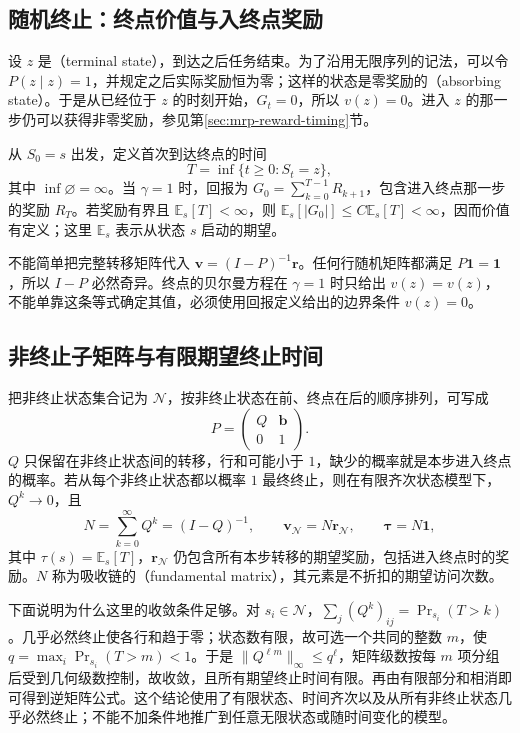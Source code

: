 \documentclass[UTF8]{ctexart}
\begin{document}
\subsection{随机终止：终点价值与入终点奖励}

设 $z$ 是（terminal state），到达之后任务结束。为了沿用无限序列的记法，可以令 $P(z\mid z)=1$，并规定之后实际奖励恒为零；这样的状态是零奖励的（absorbing state）。于是从已经位于 $z$ 的时刻开始，$G_t=0$，所以 $v(z)=0$。进入 $z$ 的那一步仍可以获得非零奖励，参见第\ref{sec:mrp-reward-timing}节。

从 $S_0=s$ 出发，定义首次到达终点的时间
\[
  T=\inf\{t\geq0:S_t=z\},
\]
其中 $\inf\varnothing=\infty$。当 $\gamma=1$ 时，回报为 $G_0=\sum_{k=0}^{T-1}R_{k+1}$，包含进入终点那一步的奖励 $R_T$。若奖励有界且 $\mathbb E_s[T]<\infty$，则 $\mathbb E_s[|G_0|]\leq C\mathbb E_s[T]<\infty$，因而价值有定义；这里 $\mathbb E_s$ 表示从状态 $s$ 启动的期望。

不能简单把完整转移矩阵代入 $\boldsymbol v=(I-P)^{-1}\boldsymbol r$。任何行随机矩阵都满足 $P\boldsymbol 1=\boldsymbol 1$，所以 $I-P$ 必然奇异。终点的贝尔曼方程在 $\gamma=1$ 时只给出 $v(z)=v(z)$，不能单靠这条等式确定其值，必须使用回报定义给出的边界条件 $v(z)=0$。

\subsection{非终止子矩阵与有限期望终止时间}

把非终止状态集合记为 $\mathcal N$，按非终止状态在前、终点在后的顺序排列，可写成
\[
  P=\begin{pmatrix}Q&\boldsymbol b\\0&1\end{pmatrix}.
\]
$Q$ 只保留在非终止状态间的转移，行和可能小于 $1$，缺少的概率就是本步进入终点的概率。若从每个非终止状态都以概率 $1$ 最终终止，则在有限齐次状态模型下，$Q^k\to0$，且
\begin{equation}
  N=\sum_{k=0}^{\infty}Q^k=(I-Q)^{-1},\qquad
  \boldsymbol v_{\mathcal N}=N\boldsymbol r_{\mathcal N},\qquad
  \boldsymbol\tau=N\boldsymbol 1,
  \label{eq:mrp-transient-system}
\end{equation}
其中 $\tau(s)=\mathbb E_s[T]$，$\boldsymbol r_{\mathcal N}$ 仍包含所有本步转移的期望奖励，包括进入终点时的奖励。$N$ 称为吸收链的（fundamental matrix），其元素是不折扣的期望访问次数。

下面说明为什么这里的收敛条件足够。对 $s_i\in\mathcal N$，$\sum_j(Q^k)_{ij}=\Pr_{s_i}(T>k)$。几乎必然终止使各行和趋于零；状态数有限，故可选一个共同的整数 $m$，使 $q=\max_i\Pr_{s_i}(T>m)<1$。于是 $\|Q^{\ell m}\|_\infty\leq q^\ell$，矩阵级数按每 $m$ 项分组后受到几何级数控制，故收敛，且所有期望终止时间有限。再由有限部分和相消即可得到逆矩阵公式。这个结论使用了有限状态、时间齐次以及从所有非终止状态几乎必然终止；不能不加条件地推广到任意无限状态或随时间变化的模型。
\end{document}

